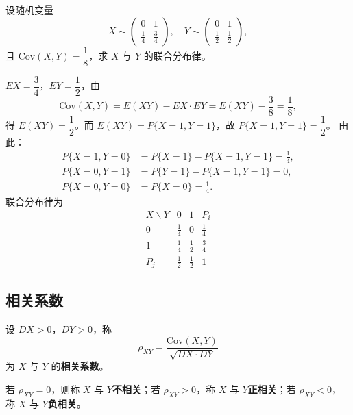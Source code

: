 ﻿\documentclass[lang=cn,11pt]{elegantbook}
\begin{document}
\begin{exercise}\label{exer:4-s12-cov2joint}
设随机变量
\[
X \sim \begin{pmatrix} 0 & 1 \\ \frac{1}{4} & \frac{3}{4} \end{pmatrix},\quad
Y \sim \begin{pmatrix} 0 & 1 \\ \frac{1}{2} & \frac{1}{2} \end{pmatrix},
\]
且 \(\mathrm{Cov}(X,Y) = \dfrac{1}{8}\)，求 \(X\) 与 \(Y\) 的联合分布律。
\end{exercise}

\begin{solution}
\(EX = \dfrac{3}{4}\)，\(EY = \dfrac{1}{2}\)，由
\[
\mathrm{Cov}(X,Y) = E(XY) - EX \cdot EY = E(XY) - \frac{3}{8} = \frac{1}{8},
\]
得 \(E(XY) = \dfrac{1}{2}\)。而 \(E(XY) = P\{X=1,Y=1\}\)，故 \(P\{X=1,Y=1\} = \dfrac{1}{2}\)。
由此：
\begin{align*}
P\{X=1,Y=0\} &= P\{X=1\} - P\{X=1,Y=1\} = \frac{1}{4},\\
P\{X=0,Y=1\} &= P\{Y=1\} - P\{X=1,Y=1\} = 0,\\
P\{X=0,Y=0\} &= P\{X=0\} = \frac{1}{4}.
\end{align*}
联合分布律为
\[
\begin{array}{c|cc|c}
X \backslash Y & 0 & 1 & P_i \\
\hline
0 & \frac{1}{4} & 0 & \frac{1}{4} \\[4pt]
1 & \frac{1}{4} & \frac{1}{2} & \frac{3}{4} \\
\hline
P_j & \frac{1}{2} & \frac{1}{2} & 1
\end{array}
\]
\end{solution}


\subsection{相关系数}

\begin{definition}[相关系数] \label{def:correlation}
设 \(DX > 0\)，\(DY > 0\)，称
\[
\rho_{XY} = \frac{\mathrm{Cov}(X,Y)}{\sqrt{DX \cdot DY}}
\]
为 \(X\) 与 \(Y\) 的\textbf{相关系数}。

若 \(\rho_{XY} = 0\)，则称 \(X\) 与 \(Y\)\textbf{不相关}；若 \(\rho_{XY} > 0\)，称 \(X\) 与 \(Y\)\textbf{正相关}；若 \(\rho_{XY} < 0\)，称 \(X\) 与 \(Y\)\textbf{负相关}。
\end{definition}
\end{document}
